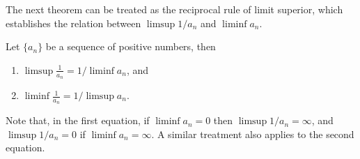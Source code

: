 \documentclass[thmcnt=section, 12pt]{my-elegantbook}
\begin{document}

The next theorem can be treated as the reciprocal rule of limit superior, which establishes the relation between $\limsup 1 / a_n$ and $\liminf a_n$.

\begin{theorem}
    Let $\{a_n\}$ be a sequence of positive numbers, then 
    \begin{enumerate}
        \item $\limsup \frac{1}{a_n} = 1 / \liminf a_n$, and 
        \item $\liminf \frac{1}{a_n} = 1 / \limsup a_n$.
    \end{enumerate}
    Note that, in the first equation, if $\liminf a_n = 0$ then $\limsup 1 / a_n = \infty$, and $\limsup 1 / a_n = 0$ if $\liminf a_n = \infty$. A similar treatment also applies to the second equation.
\end{theorem}
\end{document}
